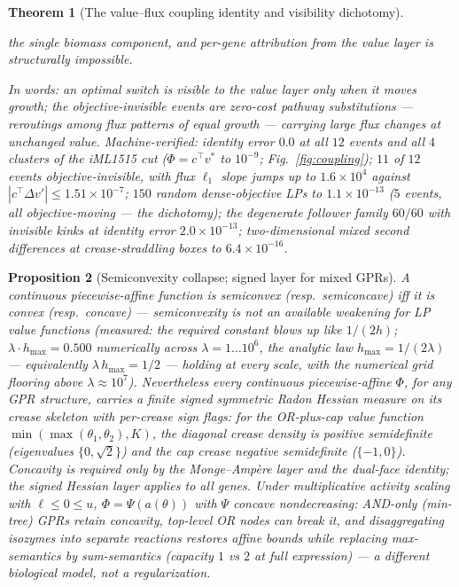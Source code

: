 \documentclass[11pt,a4paper]{article}
\theoremstyle{plain}
\newtheorem{theorem}{Theorem}[section]
\newtheorem{proposition}[theorem]{Proposition}
\theoremstyle{definition}
\theoremstyle{remark}
\begin{document}
\begin{theorem}[The value--flux coupling identity and visibility
dichotomy]
\begin{enumerate}[label=(\roman*),leftmargin=2em]
      the single biomass component, and per-gene attribution from the
      value layer is structurally impossible.
\end{enumerate}
In words: an optimal switch is visible to the value layer only when it
moves growth; the objective-invisible events are zero-cost pathway
substitutions --- reroutings among flux patterns of equal growth ---
carrying large flux changes at unchanged value.
Machine-verified: identity error $0.0$ at all $12$ events and all
$4$ clusters of the iML1515 cut ($\Phi = c^\top v^*$ to $10^{-9}$;
Fig.~\ref{fig:coupling});
$11$ of $12$ events objective-invisible, with flux $\ell_1$ slope
jumps up to $1.6 \times 10^{4}$ against $|c^\top \Delta v'| \le
1.51 \times 10^{-7}$; $150$ random dense-objective LPs to $1.1 \times
10^{-13}$ ($5$ events, all objective-moving --- the dichotomy); the
degenerate follower family $60/60$ with invisible kinks at identity
error $2.0 \times 10^{-13}$; two-dimensional mixed second
differences at crease-straddling boxes to $6.4 \times 10^{-16}$.
\end{theorem}

\begin{proposition}[Semiconvexity collapse; signed layer for mixed
GPRs]\label{prop:semiconvex}
A continuous piecewise-affine function is semiconvex (resp.\
semiconcave) iff it is convex (resp.\ concave) --- semiconvexity is
not an available weakening for LP value functions (measured: the
required constant blows up like $1/(2h)$; $\lambda \cdot h_{\max}
= 0.500$ numerically across $\lambda = 1 \dots 10^{6}$, the analytic
law $h_{\max} = 1/(2\lambda)$ --- equivalently $\lambda\,
h_{\max} = 1/2$ --- holding at every scale,
with the numerical grid flooring above $\lambda \approx 10^{7}$).
Nevertheless
every continuous piecewise-affine $\Phi$, for any GPR structure,
carries a finite \emph{signed} symmetric Radon Hessian measure on
its crease skeleton with per-crease sign flags: for the OR-plus-cap
value function $\min(\max(\theta_1,\theta_2), K)$, the diagonal
crease density is positive semidefinite (eigenvalues
$\{0,\sqrt2\}$) and the cap crease negative semidefinite
($\{-1,0\}$). Concavity is required only by the
Monge--Amp\`ere layer and the dual-face identity; the signed Hessian
layer applies to all genes. Under multiplicative activity scaling
with $\ell \le 0 \le u$, $\Phi = \Psi(a(\theta))$ with $\Psi$
concave nondecreasing: AND-only (min-tree) GPRs retain concavity,
top-level OR nodes can break it, and disaggregating isozymes into
separate reactions restores affine bounds while replacing
max-semantics by sum-semantics (capacity $1$ vs $2$ at full
expression) --- a different biological model, not a regularization.
\end{proposition}
\end{document}
